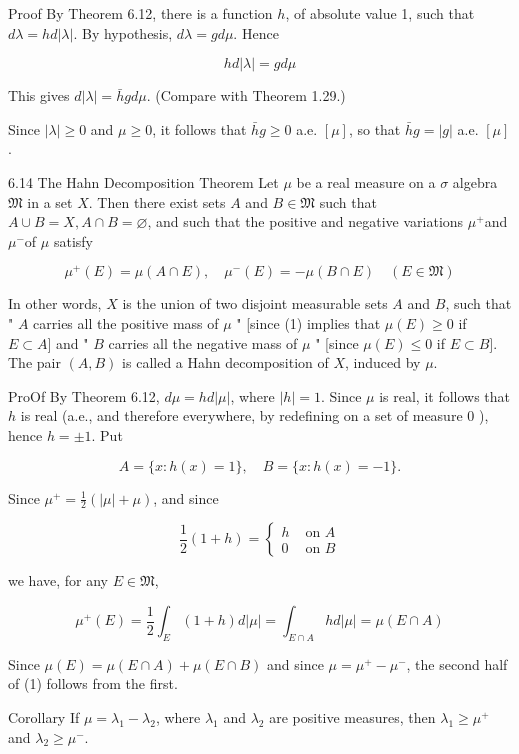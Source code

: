 \documentclass[10pt]{article}
\begin{document}
Proof By Theorem 6.12, there is a function $h$, of absolute value 1, such that $d \lambda=h d|\lambda|$. By hypothesis, $d \lambda=g d \mu$. Hence

$$
h d|\lambda|=g d \mu
$$

This gives $d|\lambda|=\bar{h} g d \mu$. (Compare with Theorem 1.29.)

Since $|\lambda| \geq 0$ and $\mu \geq 0$, it follows that $\bar{h} g \geq 0$ a.e. $[\mu]$, so that $\bar{h} g=|g|$ a.e. $[\mu]$.

6.14 The Hahn Decomposition Theorem Let $\mu$ be a real measure on a $\sigma$ algebra $\mathfrak{M}$ in a set $X$. Then there exist sets $A$ and $B \in \mathfrak{M}$ such that
$A \cup B=X, A \cap B=\varnothing$, and such that the positive and negative variations $\mu^{+}$and $\mu^{-}$of $\mu$ satisfy

$$
\mu^{+}(E)=\mu(A \cap E), \quad \mu^{-}(E)=-\mu(B \cap E) \quad(E \in \mathfrak{M})
$$

In other words, $X$ is the union of two disjoint measurable sets $A$ and $B$, such that " $A$ carries all the positive mass of $\mu$ " [since (1) implies that $\mu(E) \geq 0$ if $E \subset A]$ and " $B$ carries all the negative mass of $\mu$ " [since $\mu(E) \leq 0$ if $E \subset B]$. The pair $(A, B)$ is called a Hahn decomposition of $X$, induced by $\mu$.

ProOf By Theorem 6.12, $d \mu=h d|\mu|$, where $|h|=1$. Since $\mu$ is real, it follows that $h$ is real (a.e., and therefore everywhere, by redefining on a set of measure 0 ), hence $h= \pm 1$. Put

$$
A=\{x: h(x)=1\}, \quad B=\{x: h(x)=-1\} .
$$

Since $\mu^{+}=\frac{1}{2}(|\mu|+\mu)$, and since

$$
\frac{1}{2}(1+h)= \begin{cases}h & \text { on } A \\ 0 & \text { on } B\end{cases}
$$

we have, for any $E \in \mathfrak{M}$,

$$
\mu^{+}(E)=\frac{1}{2} \int_{E}(1+h) d|\mu|=\int_{E \cap A} h d|\mu|=\mu(E \cap A)
$$

Since $\mu(E)=\mu(E \cap A)+\mu(E \cap B)$ and since $\mu=\mu^{+}-\mu^{-}$, the second half of (1) follows from the first.

Corollary If $\mu=\lambda_{1}-\lambda_{2}$, where $\lambda_{1}$ and $\lambda_{2}$ are positive measures, then $\lambda_{1} \geq \mu^{+}$ and $\lambda_{2} \geq \mu^{-}$.
\end{document}
